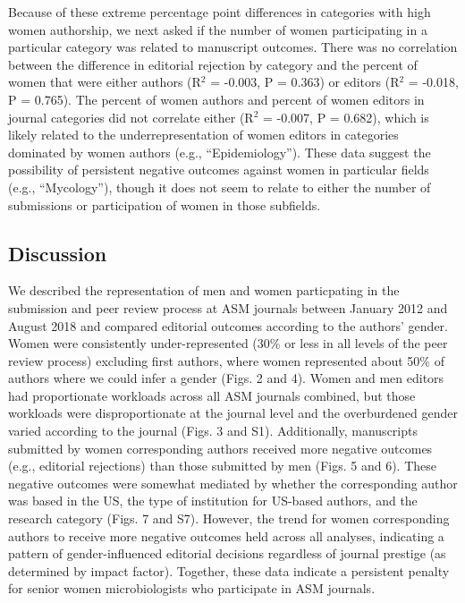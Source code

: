 \documentclass[11pt,]{article}
\begin{document}
Because of these extreme percentage point differences in categories with
high women authorship, we next asked if the number of women
participating in a particular category was related to manuscript
outcomes. There was no correlation between the difference in editorial
rejection by category and the percent of women that were either authors
(R\({^2}\) = -0.003, P = 0.363) or editors (R\({^2}\) = -0.018, P =
0.765). The percent of women authors and percent of women editors in
journal categories did not correlate either (R\({^2}\) = -0.007, P =
0.682), which is likely related to the underrepresentation of women
editors in categories dominated by women authors (e.g.,
``Epidemiology''). These data suggest the possibility of persistent
negative outcomes against women in particular fields (e.g.,
``Mycology''), though it does not seem to relate to either the number of
submissions or participation of women in those subfields.

\subsection{Discussion}\label{discussion}

We described the representation of men and women particpating in the
submission and peer review process at ASM journals between January 2012
and August 2018 and compared editorial outcomes according to the
authors' gender. Women were consistently under-represented (30\% or less
in all levels of the peer review process) excluding first authors, where
women represented about 50\% of authors where we could infer a gender
(Figs. 2 and 4). Women and men editors had proportionate workloads
across all ASM journals combined, but those workloads were
disproportionate at the journal level and the overburdened gender varied
according to the journal (Figs. 3 and S1). Additionally, manuscripts
submitted by women corresponding authors received more negative outcomes
(e.g., editorial rejections) than those submitted by men (Figs. 5 and
6). These negative outcomes were somewhat mediated by whether the
corresponding author was based in the US, the type of institution for
US-based authors, and the research category (Figs. 7 and S7). However,
the trend for women corresponding authors to receive more negative
outcomes held across all analyses, indicating a pattern of
gender-influenced editorial decisions regardless of journal prestige (as
determined by impact factor). Together, these data indicate a persistent
penalty for senior women microbiologists who participate in ASM
journals.
\end{document}
